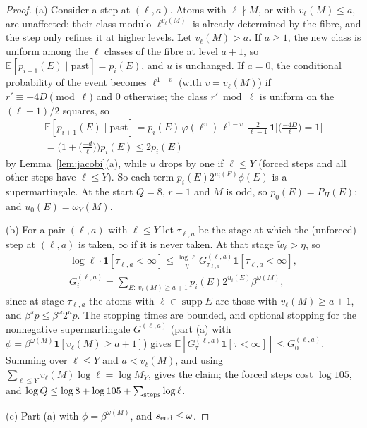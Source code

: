\documentclass[11pt,reqno]{amsart}
\theoremstyle{definition}
\newcommand{\E}{\mathbb E}
\newcommand{\supp}{\operatorname{supp}}
\begin{document}
\begin{proof}
(a) Consider a step at $(\ell,a)$.  Atoms with $\ell\nmid M$, or with
$v_\ell(M)\le a$, are unaffected: their class modulo $\ell^{v_\ell(M)}$ is
already determined by the fibre, and the step only refines it at higher
levels.  Let $v_\ell(M)>a$.  If $a\ge1$, the new class is uniform among the
$\ell$ classes of the fibre at level $a+1$, so $\E[p_{i+1}(E)\mid\text{past}]=p_i(E)$,
and $u$ is unchanged.  If $a=0$, the conditional probability of the event
becomes $\ell^{1-v}$ (with $v=v_\ell(M)$) if $r'\equiv-4D\pmod\ell$ and $0$
otherwise; the class $r'\bmod\ell$ is uniform on the $(\ell-1)/2$ squares, so
\begin{multline*}
 \E[p_{i+1}(E)\mid\text{past}]=p_i(E)\,\varphi(\ell^v)\,\ell^{1-v}\,\frac{2}{\ell-1}\,\mathbf 1\Big[\Big(\frac{-4D}\ell\Big)=1\Big]\\
 =\Big(1+\Big(\frac{-d}\ell\Big)\Big)p_i(E)\le2p_i(E)
\end{multline*}
by Lemma~\ref{lem:jacobi}(a), while $u$ drops by one if $\ell\le Y$ (forced
steps and all other steps have $\ell\le Y$).  So each term
$p_i(E)2^{u_i(E)}\phi(E)$ is a supermartingale.  At the start $Q=8$, $r=1$
and $M$ is odd, so $p_0(E)=P_H(E)$; and $u_0(E)=\omega_Y(M)$.

(b) For a pair $(\ell,a)$ with $\ell\le Y$ let $\tau_{\ell,a}$ be the stage at
which the (unforced) step at $(\ell,a)$ is taken, $\infty$ if it is never taken.
At that stage $\tilde w_\ell>\eta$, so
\begin{multline*}
 \log\ell\cdot\mathbf 1[\tau_{\ell,a}<\infty]\le\frac{\log\ell}\eta\,G^{(\ell,a)}_{\tau_{\ell,a}}\mathbf 1[\tau_{\ell,a}<\infty],\\
 G^{(\ell,a)}_i=\sum_{E:\ v_\ell(M)\ge a+1}p_i(E)2^{u_i(E)}\beta^{\omega(M)},
\end{multline*}
since at stage $\tau_{\ell,a}$ the atoms with $\ell\in\supp E$ are those with
$v_\ell(M)\ge a+1$, and $\beta^{s}p\le\beta^{\omega}2^up$.  The stopping times
are bounded, and optional stopping for the nonnegative supermartingale
$G^{(\ell,a)}$ (part (a) with $\phi=\beta^{\omega(M)}\mathbf 1[v_\ell(M)\ge a+1]$)
gives $\E[G^{(\ell,a)}_{\tau}\mathbf 1[\tau<\infty]]\le G^{(\ell,a)}_0$.  Summing over
$\ell\le Y$ and $a<v_\ell(M)$, and using $\sum_{\ell\le Y}v_\ell(M)\log\ell=\log M_Y$,
gives the claim; the forced steps cost $\log105$, and $\log Q\le\log8+\log105+\sum_{\rm steps}\log\ell$.

(c) Part (a) with $\phi=\beta^{\omega(M)}$, and $s_{\rm end}\le\omega$.


\end{proof}
\end{document}
